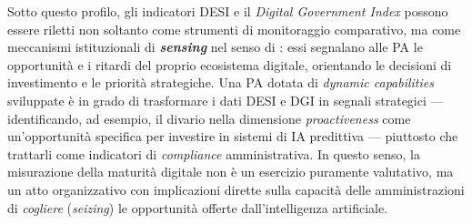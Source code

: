 
Sotto questo profilo, gli indicatori DESI e il \textit{Digital Government Index} possono essere riletti non soltanto come strumenti di monitoraggio comparativo, ma come meccanismi istituzionali di \textbf{\textit{sensing}} nel senso di \textcite{Teece2007}: essi segnalano alle PA le opportunità e i ritardi del proprio ecosistema digitale, orientando le decisioni di investimento e le priorità strategiche. Una PA dotata di \textit{dynamic capabilities} sviluppate è in grado di trasformare i dati DESI e DGI in segnali strategici --- identificando, ad esempio, il divario nella dimensione \textit{proactiveness} come un'opportunità specifica per investire in sistemi di IA predittiva --- piuttosto che trattarli come indicatori di \textit{compliance} amministrativa. In questo senso, la misurazione della maturità digitale non è un esercizio puramente valutativo, ma un atto organizzativo con implicazioni dirette sulla capacità delle amministrazioni di \textit{cogliere} (\textit{seizing}) le opportunità offerte dall'intelligenza artificiale.
